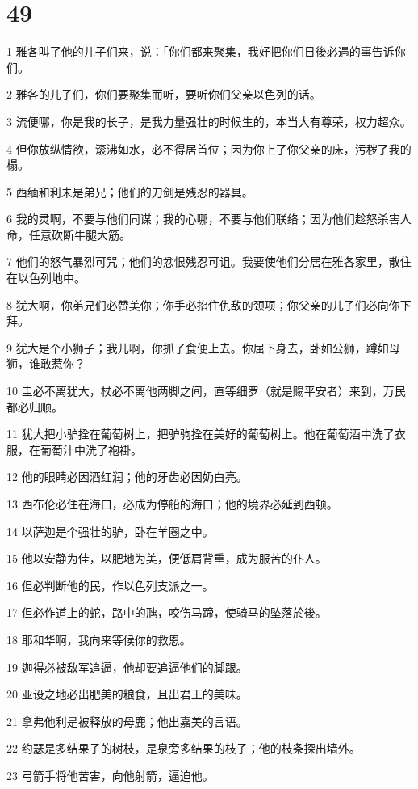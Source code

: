 \chapter{49}

\par 1 雅各叫了他的儿子们来，说：「你们都来聚集，我好把你们日後必遇的事告诉你们。
\par 2 雅各的儿子们，你们要聚集而听，要听你们父亲以色列的话。
\par 3 流便哪，你是我的长子，是我力量强壮的时候生的，本当大有尊荣，权力超众。
\par 4 但你放纵情欲，滚沸如水，必不得居首位；因为你上了你父亲的床，污秽了我的榻。
\par 5 西缅和利未是弟兄；他们的刀剑是残忍的器具。
\par 6 我的灵啊，不要与他们同谋；我的心哪，不要与他们联络；因为他们趁怒杀害人命，任意砍断牛腿大筋。
\par 7 他们的怒气暴烈可咒；他们的忿恨残忍可诅。我要使他们分居在雅各家里，散住在以色列地中。
\par 8 犹大啊，你弟兄们必赞美你；你手必掐住仇敌的颈项；你父亲的儿子们必向你下拜。
\par 9 犹大是个小狮子；我儿啊，你抓了食便上去。你屈下身去，卧如公狮，蹲如母狮，谁敢惹你？
\par 10 圭必不离犹大，杖必不离他两脚之间，直等细罗（就是赐平安者）来到，万民都必归顺。
\par 11 犹大把小驴拴在葡萄树上，把驴驹拴在美好的葡萄树上。他在葡萄酒中洗了衣服，在葡萄汁中洗了袍褂。
\par 12 他的眼睛必因酒红润；他的牙齿必因奶白亮。
\par 13 西布伦必住在海口，必成为停船的海口；他的境界必延到西顿。
\par 14 以萨迦是个强壮的驴，卧在羊圈之中。
\par 15 他以安静为佳，以肥地为美，便低肩背重，成为服苦的仆人。
\par 16 但必判断他的民，作以色列支派之一。
\par 17 但必作道上的蛇，路中的虺，咬伤马蹄，使骑马的坠落於後。
\par 18 耶和华啊，我向来等候你的救恩。
\par 19 迦得必被敌军追逼，他却要追逼他们的脚跟。
\par 20 亚设之地必出肥美的粮食，且出君王的美味。
\par 21 拿弗他利是被释放的母鹿；他出嘉美的言语。
\par 22 约瑟是多结果子的树枝，是泉旁多结果的枝子；他的枝条探出墙外。
\par 23 弓箭手将他苦害，向他射箭，逼迫他。
